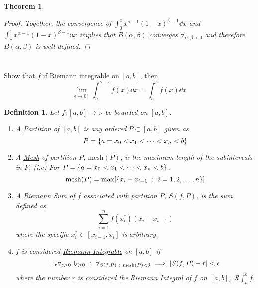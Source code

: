 \documentclass[]{article}
\newcommand{\R}{\mathbb{R}}
\newcommand{\st}{\ : \ }
\newtheorem{definition}{Definition}
\newtheorem{theorem}{Theorem}
\begin{document}
\begin{theorem}
\begin{proof}
        Together, the convergence of $\int_{0}^{c} x^{\alpha-1} (1-x)^{\beta-1} \dd{x}$ 
        and $\int_{c}^{1} x^{\alpha-1} (1-x)^{\beta-1} \dd{x}$ 
        implies that $B(\alpha,\beta)$ converges $\forall_{\alpha,\beta>0}$ and therefore $B(\alpha,\beta)$ is well defined.
    \end{proof}
\end{theorem}

\newpage
\section{}
Show that $f$ if Riemann integrable on $[a,b]$, then \[
    \lim_{\epsilon\to 0^{+}} \int_{a}^{b - \epsilon} f(x) \dd{x} = \int_{a}^{b} f(x) \dd{x}
\]

\begin{definition}\label{def:Riemann_int}
    Let $f: [a,b] \to \R$ be bounded on $[a,b]$.
    \begin{enumerate}
        \item A \emph{\underline{Partition}} of $[a,b]$ is any ordered $P \subset [a,b]$ given as \[
            P = \qty{a = x_0 < x_1 < \cdots < x_n < b}
        \]
        \item A \emph{\underline{Mesh}} of partition $P$, $\text{mesh}(P)$, is the maximum length of the subintervals in $P$. 
        (i.e) For $P  = \qty{a = x_0 < x_1 < \cdots < x_n < b}$,\[
            \text{mesh}(P) = \max[\qty{x_{i} - x_{i-1} \st i = 1, 2, \dots, n}]
        \]
        \item A \emph{\underline{Riemann Sum}} of $f$ associated with partition $P$, $S(f,P)$, is the sum defined as \[
            \sum_{i=1}^{n} f(x_i^{*}) (x_i - x_{i-1})
        \] where the specific $x_{i}^{*} \in [x_{i-1}, x_{i}]$ is arbitrary.
        \item $f$ is considered \emph{\underline{Riemann Integrable}} on $[a,b]$ if\[
            \exists_{r} \forall_{\epsilon>0} \exists_{\delta>0} 
            \st \forall_{S(f,P) \st \text{mesh}(P) < \delta} \implies \abs{S(f,P) - r} < \epsilon
        \] where the number $r$ is considered the \emph{\underline{Riemann Integral}} of $f$ on $[a,b]$, $\mathcal{R}\int_{a}^{b} f$.
    \end{enumerate}
\end{definition}
\end{document}

